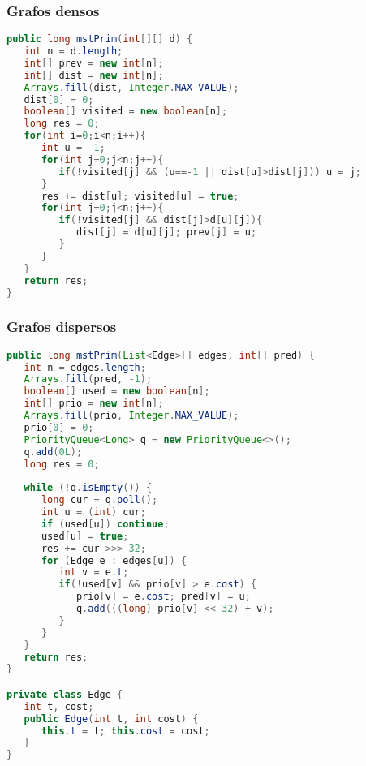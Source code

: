 \subsubsection{Grafos densos}
\begin{lstlisting}[language=Java]
public long mstPrim(int[][] d) {
   int n = d.length;
   int[] prev = new int[n];
   int[] dist = new int[n];
   Arrays.fill(dist, Integer.MAX_VALUE);
   dist[0] = 0;
   boolean[] visited = new boolean[n];
   long res = 0;
   for(int i=0;i<n;i++){
      int u = -1;
      for(int j=0;j<n;j++){
         if(!visited[j] && (u==-1 || dist[u]>dist[j])) u = j;
      }
      res += dist[u]; visited[u] = true;
	  for(int j=0;j<n;j++){
         if(!visited[j] && dist[j]>d[u][j]){
            dist[j] = d[u][j]; prev[j] = u;
         }
      }
   }
   return res;
}
\end{lstlisting}

\subsubsection{Grafos dispersos}
\begin{lstlisting}[language=Java]
public long mstPrim(List<Edge>[] edges, int[] pred) {
   int n = edges.length;
   Arrays.fill(pred, -1);
   boolean[] used = new boolean[n];
   int[] prio = new int[n];
   Arrays.fill(prio, Integer.MAX_VALUE);
   prio[0] = 0;
   PriorityQueue<Long> q = new PriorityQueue<>();
   q.add(0L);
   long res = 0;
   
   while (!q.isEmpty()) {
      long cur = q.poll();
      int u = (int) cur;
      if (used[u]) continue;
      used[u] = true;
      res += cur >>> 32;
      for (Edge e : edges[u]) {
         int v = e.t;
         if(!used[v] && prio[v] > e.cost) {
            prio[v] = e.cost; pred[v] = u;
            q.add(((long) prio[v] << 32) + v);
         }
      }
   }
   return res;
}

private class Edge {
   int t, cost;
   public Edge(int t, int cost) {
      this.t = t; this.cost = cost;
   }
}
\end{lstlisting}